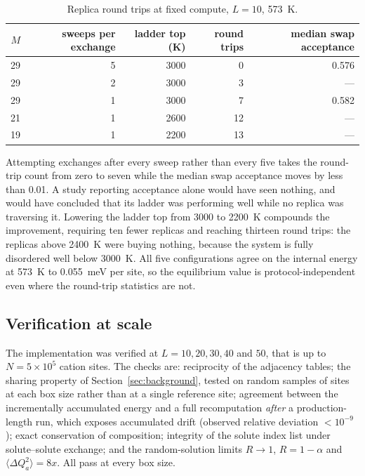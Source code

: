 \documentclass[11pt,a4paper]{article}
\newcommand{\dQ}{\Delta Q}
\begin{document}
\begin{table}[htbp]
\centering
\caption{Replica round trips at fixed compute, $L = 10$, 573~K.}
\label{tab:rt}
\small
\begin{tabular}{rrrrr}
\toprule
$M$ & sweeps per exchange & ladder top (K) & round trips & median swap acceptance \\
\midrule
29 & 5 & 3000 & 0  & 0.576 \\
29 & 2 & 3000 & 3  & --- \\
29 & 1 & 3000 & 7  & 0.582 \\
21 & 1 & 2600 & 12 & --- \\
19 & 1 & 2200 & 13 & --- \\
\bottomrule
\end{tabular}
\end{table}

Attempting exchanges after every sweep rather than every five takes the
round-trip count from zero to seven while the median swap acceptance moves by
less than 0.01. A study reporting acceptance alone would have seen nothing, and
would have concluded that its ladder was performing well while no replica was
traversing it. Lowering the ladder top from 3000 to 2200~K compounds the
improvement, requiring ten fewer replicas and reaching thirteen round trips: the
replicas above 2400~K were buying nothing, because the system is fully
disordered well below 3000~K. All five configurations agree on the internal
energy at 573~K to 0.055~meV per site, so the equilibrium value is
protocol-independent even where the round-trip statistics are not.

\subsection{Verification at scale}

The implementation was verified at $L = 10, 20, 30, 40$ and $50$, that is up to
$N = 5\times10^5$ cation sites. The checks are: reciprocity of the adjacency
tables; the sharing property of Section~\ref{sec:background}, tested on random
samples of sites at each box size rather than at a single reference site;
agreement between the incrementally accumulated energy and a full recomputation
\emph{after} a production-length run, which exposes accumulated drift (observed
relative deviation $<10^{-9}$); exact conservation of composition; integrity of
the solute index list under solute--solute exchange; and the random-solution
limits $R \to 1$, $R = 1 - \alpha$ and $\langle\dQ_a^2\rangle = 8x$. All pass at
every box size.
\end{document}
